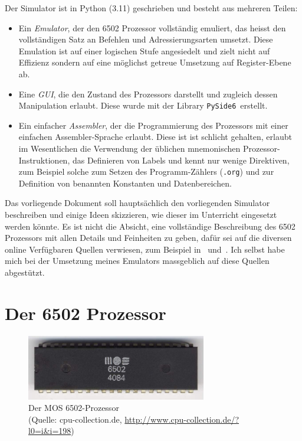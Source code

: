 \documentclass[11pt]{scrartcl}
\newcommand{\pyside}{\lstinline!PySide6!}
\begin{document}
Der Simulator ist in Python (3.11) geschrieben und besteht aus
mehreren Teilen:
\begin{itemize}
\item Ein \emph{Emulator}, der den 6502 Prozessor vollständig
  emuliert, das heisst den vollständigen Satz an Befehlen und
  Adressierungsarten umsetzt. Diese Emulation ist auf einer logischen
  Stufe angesiedelt und zielt nicht auf Effizienz sondern auf eine
  möglichst getreue Umsetzung auf Register-Ebene ab.
\item Eine \emph{GUI}, die den Zustand des Prozessors darstellt und
  zugleich dessen Manipulation erlaubt.  Diese wurde mit der Library
  \pyside\ erstellt.
\item Ein einfacher \emph{Assembler}, der die Programmierung des
  Prozessors mit einer einfachen Assembler-Sprache erlaubt. Diese ist
  ist schlicht gehalten, erlaubt im Wesentlichen die Verwendung der
  üblichen mnemonischen Prozessor-Instruktionen, das Definieren von
  Labels und kennt nur wenige Direktiven, zum Beispiel solche zum
  Setzen des Programm-Zählers (\lstinline!.org!) und zur Definition
  von benannten Konstanten und Datenbereichen.
\end{itemize}

Das vorliegende Dokument soll hauptsächlich den vorliegenden Simulator
beschreiben und einige Ideen skizzieren, wie dieser im Unterricht
eingesetzt werden könnte. Es ist nicht die Absicht, eine vollständige
Beschreibung des 6502 Prozessors mit allen Details und Feinheiten zu
geben, dafür sei auf die diversen online Verfügbaren Quellen
verwiesen, zum Beispiel in~\cite{6502org_reference}
und~\cite{masswerk_6502instructions}. Ich selbst habe mich bei der
Umsetzung meines Emulators massgeblich auf diese Quellen abgestützt.

\newpage
\section{Der 6502 Prozessor}
\begin{figure}
  \centering \includegraphics[width=0.7\textwidth]{6502processor.jpeg}
  \caption{Der MOS 6502-Prozessor \\ (Quelle: cpu-collection.de,
    {\small \protect\url{http://www.cpu-collection.de/?l0=i&i=198})}}
\end{figure}
\end{document}
